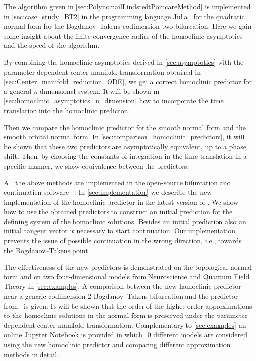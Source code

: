 The algorithm given in \cref{sec:PolynomailLindstedtPoincareMethod} is implemented in
\cref{sec:case_study_BT2} in the programming language
Julia~\cite{bezanson2017julia} for the quadratic normal form for the
Bogdanov--Takens codimension two bifurcation. Here we gain some insight about the
finite convergence radius of the homoclinic asymptotics and the speed of the
algorithm.

By combining the homoclinic asymptotics derived in \cref{sec:asymptotics} with
the parameter-de\-pendent center manifold transformation obtained in
\cref{sec:Center_manifold_reduction_ODE}, we get a correct homoclinic
predictor for a general $n$-dimensional system.  It will be shown in
\cref{sec:homoclinic_asymptotics_n_dimension} how to incorporate the time
translation into the homoclinic predictor.
 
Then we compare the homoclinic predictor for the smooth
normal form and the smooth orbital normal form. In
\cref{sec:comparison_homoclinic_predictors}, it will be shown that these two
predictors are asymptotically equivalent, up to a phase shift. Then, by
choosing the constants of integration in the time translation in a specific
manner, we show equivalence between the predictors.

All the above methods are implemented in the open-source bifurcation and
continuation software \MATCONT ~\cite{matcont2}.  In
\cref{sec:implementation} we describe the new implementation of the homoclinic
predictor in the latest version of \MATCONT. We show how to use the obtained
predictors to construct an initial prediction for the defining system of the
homoclinic solutions. Besides an initial prediction also an initial tangent
vector is necessary to start continuation.  Our implementation prevents the
issue of possible continuation in the wrong direction, i.e., towards the
Bogdanov--Takens point. 

The effectiveness of the new predictors is demonstrated on the topological
normal form and on two four-dimensional models from Neuroscience and Quantum
Field Theory in \cref{sec:examples}. A comparison between the new homoclinic
predictor near a generic codimension 2 Bogdanov--Takens bifurcation and the
predictor from~\cite{Al-Hdaibat2016} is given. It will be shown that the order
of the higher-order approximations to the homoclinic solutions in the normal
form is preserved under the parameter-dependent center manifold transformation.
Complementary to \cref{sec:examples} an 
\href{https://mmbosschaert.github.io/MatCont7p2NewInitBTHom-/}{online Jupyter Notebook}
is provided in which 10 different models are considered using the new
homoclinic predictor and comparing different approximation methods in detail.
